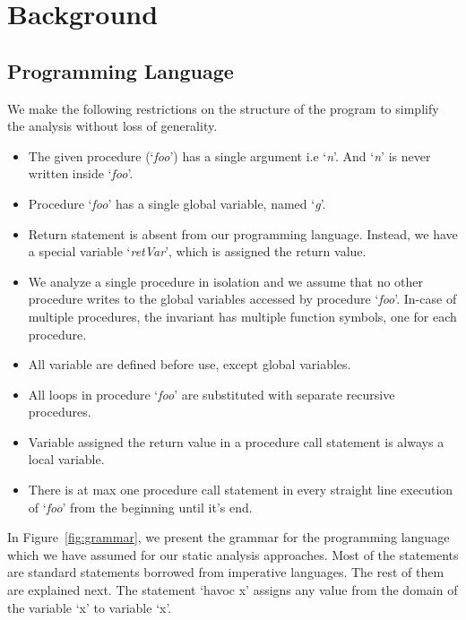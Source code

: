 \documentclass{llncs}
\newcommand{\foo}{\textit{foo}}
\newcommand{\retVar}{\textit{retVar}}
\newcommand{\n}{\textit{n}}
\newcommand{\g}{\textit{g}}
\begin{document}
\section{Background} \label{sec:background}

\subsection{Programming Language}
We make the following restrictions on the structure of the program to
simplify the analysis without loss of generality.

\begin{itemize}
\item The given procedure (`\foo') has a single argument i.e `\n'. And
  `\n' is never written inside `\foo'.
\item Procedure `\foo' has a single global variable, named `\g'.
\item Return statement is absent from our programming language. Instead,
  we have a special variable `\retVar', which is assigned the return
  value.
\item We analyze a single procedure in isolation and we assume that no
  other procedure writes to the global variables accessed by procedure
  `\foo'. In-case of multiple procedures, the invariant has multiple
  function symbols, one for each procedure. 
\item All variable are defined before use, except global variables.
\item All loops in procedure `\foo' are substituted with 
  separate recursive procedures.
\item Variable assigned the return value in a procedure call
  statement is always a local variable.
\item There is at max one procedure call statement in every straight line
  execution of `\foo' from the beginning until it's end.
  \end{itemize}

In Figure~\ref{fig:grammar}, we present the grammar for the
programming language which we have assumed for our static analysis
approaches.  Most of the statements are standard statements borrowed
from imperative languages. The rest of them are explained next. The
statement `havoc x' assigns any value from the domain of the variable
`x' to variable `x'.
\end{document}
